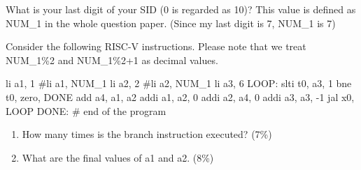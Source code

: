 \documentclass[12pt, a4paper]{article}
\begin{document}
\noindent What is your last digit of your SID (0 is regarded as 10)? This value is defined as
NUM\_1 in the whole question paper. (Since my last digit is 7, NUM\_1 is 7)\\

\begin{q}{15}
Consider the following RISC-V instructions. Please note that we treat 
NUM\_1\%2 and NUM\_1\%2+1 as decimal values.
\begin{code}
    li a1, 1    #li a1, NUM_1%
    li a2, 2    #li a2, NUM_1%
    li a3, 6
    LOOP:
    slti t0, a3, 1
    bne t0, zero, DONE
    add a4, a1, a2
    addi a1, a2, 0
    addi a2, a4, 0
    addi a3, a3, -1
    jal x0, LOOP
    DONE:
    # end of the program
\end{code}
\begin{enumerate}
    \item How many times is the branch instruction executed? (7\%)
    \item What are the final values of a1 and a2. (8\%)
\end{enumerate}
\end{q}
\end{document}
